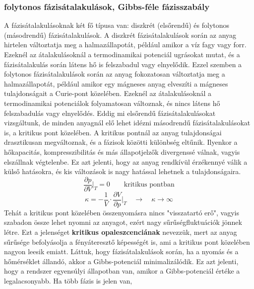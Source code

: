 \documentclass[a4paper,12pt]{article}
\begin{document}
\subsubsection{folytonos fázisátalakulások, Gibbs-féle fázisszabály}
A fázisátalakulásoknak két fő típusa van: diszkrét (elsőrendű) és folytonos (másodrendű) fázisátalakulások.
A diszkrét fázisátalakulások során az anyag hirtelen változtatja meg a halmazállapotát, például amikor a víz fagy vagy forr. Ezeknél az átalakulásoknál a termodinamikai potenciál
ugrásokat mutat, és a fázisátalakulás során látens hő is felszabadul vagy elnyelődik.
Ezzel szemben a folytonos fázisátalakulások során az anyag fokozatosan változtatja meg a halmazállapotát, például amikor egy mágneses anyag elveszíti a mágneses tulajdonságait a Curie-pont
közelében. Ezeknél az átalakulásoknál a termodinamikai potenciálok folyamatosan változnak, és nincs látens hő felszabadulás vagy elnyelődés.
\newline
\newline
Eddig mi elsőrendű fázisátalakulásokat vizsgáltunk, de minden anyagnál elő lehet idézni másodrendű fázisátalakulásokat is, a kritikus pont közelében.
A kritikus pontnál az anyag tulajdonságai drasztikusan megváltoznak, és a fázisok közötti különbség eltűnik. Ilyenkor a hőkapacitás, kompresszibilitás és más állapotjelzők
divergenssé válnak, vagyis elszállnak végtelenbe. Ez azt jelenti, hogy az anyag rendkívül érzékennyé válik a külső hatásokra, és kis változások is nagy hatással lehetnek a tulajdonságaira.
\begin{equation}
    \frac{\partial p}{\partial V}\bigg|_{T} = 0 \qquad \text{kritikus pontban}
\end{equation}
\begin{equation}
    \kappa = - \frac{1}{V} \cdot \frac{\partial V}{\partial p}\bigg|_{T} \quad \to \quad \kappa \to \infty
\end{equation}
Tehát a kritikus pont közelében összenyomásra nincs "visszatartó erő", vagyis szabadon össze lehet nyomni az anyagot, ezért nagy sűrűségfluktuációk jönnek létre.
Ezt a jelenséget \textbf{kritikus opaleszcenciának} nevezzük, mert az anyag sűrűsége befolyásolja a fényáteresztő képességét is, ami a kritikus pont közelében nagyon leesik emiatt.
\newline
\newline
Láttuk, hogy fázisátalakulások során, ha a nyomás és a hőmérséklet állandó, akkor a Gibbs-potenciál minimalizálódik.
Ez azt jelenti, hogy a rendszer egyensúlyi állapotban van, amikor a Gibbs-potenciál értéke a legalacsonyabb. Ha több fázis is jelen van,
\end{document}
